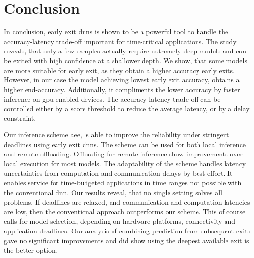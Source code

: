 \hypertarget{conclusion}{%
\chapter{Conclusion}\label{ch:conclusion}}


In conclusion, early exit \gls{dnn}s is shown to be a powerful tool to handle the accuracy-latency trade-off important for time-critical applications. The study reveals, that only a few samples actually require extremely deep models and can be exited with high confidence at a shallower depth. We show, that some models are more suitable for early exit, as they obtain a higher accuracy early exits. However, in our case the model achieving lowest early exit accuracy, obtains a higher end-accuracy. Additionally, it compliments the lower accuracy by faster inference on \gls{gpu}-enabled devices. The accuracy-latency trade-off can be controlled either by a score threshold to reduce the average latency, or by a delay constraint. 

Our inference scheme \gls{aee}, is able to improve the reliability under stringent deadlines using early exit \gls{dnn}s. The scheme can be used for both local inference and remote offloading. Offloading for remote inference show improvements over local execution for most models. The adaptability of the scheme handles latency uncertainties from computation and communication delays by best effort. It enables service for time-budgeted applications in time ranges not possible with the conventional \gls{dnn}. Our results reveal, that no single setting solves all problems. If deadlines are relaxed, and communication and computation latencies are low, then the conventional approach outperforms our scheme. This of course calls for model selection, depending on hardware platforms, connectivity and application deadlines. Our analysis of combining prediction from subsequent exits gave no significant improvements and did show using the deepest available exit is the better option.

